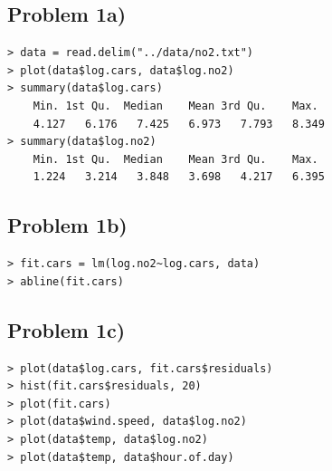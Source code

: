 \documentclass[a4paper, twocolumn]{article}
\begin{document}
\subsection*{Problem 1a)}
\begin{Verbatim}[fontsize=\footnotesize]
> data = read.delim("../data/no2.txt")
> plot(data$log.cars, data$log.no2)
> summary(data$log.cars)
    Min. 1st Qu.  Median    Mean 3rd Qu.    Max. 
    4.127   6.176   7.425   6.973   7.793   8.349 
> summary(data$log.no2)
    Min. 1st Qu.  Median    Mean 3rd Qu.    Max. 
    1.224   3.214   3.848   3.698   4.217   6.395 
\end{Verbatim}

\subsection*{Problem 1b)}
\begin{Verbatim}[fontsize=\footnotesize]
> fit.cars = lm(log.no2~log.cars, data)
> abline(fit.cars)
\end{Verbatim}

\subsection*{Problem 1c)}
\begin{Verbatim}[fontsize=\footnotesize]
> plot(data$log.cars, fit.cars$residuals)
> hist(fit.cars$residuals, 20)
> plot(fit.cars)
> plot(data$wind.speed, data$log.no2)
> plot(data$temp, data$log.no2)
> plot(data$temp, data$hour.of.day)
\end{Verbatim}
\end{document}
